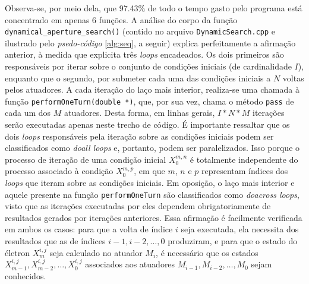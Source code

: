 \documentclass[12pt]{article}
\begin{document}
Observa-se, por meio dela, que 97.43\% de todo o tempo gasto pelo programa está
concentrado em apenas 6 funções. A análise do corpo da função
\texttt{dynamical\_aperture\_search()} (contido no arquivo
\texttt{DynamicSearch.cpp} e ilustrado pelo \textit{psedo-código}
\ref{alg:seq}, a seguir) explica perfeitamente a afirmação anterior, à medida
que explicita três \textit{loops} encadeados. Os dois primeiros são responsáveis
por iterar sobre o conjunto de condições iniciais (de cardinalidade \(I\)),
enquanto que o segundo, por submeter cada uma das condições iniciais a \(N\)
voltas pelos atuadores. A cada iteração do laço mais interior, realiza-se uma
chamada à função \texttt{performOneTurn(double *)}, que, por sua vez, chama o
método \texttt{pass} de cada um dos \(M\) atuadores.
Desta forma, em linhas gerais, \(I * N * M\) iterações serão executadas apenas
neste trecho de código. É importante ressaltar que os dois \textit{loops}
responsáveis pela iteração sobre as condições iniciais podem ser classificados
como \textit{doall loops} e, portanto, podem ser paralelizados. Isso porque o
processo de iteração de uma condição inicial \(X_0^{m,n}\) é totalmente
independente do processo associado à condição \(X_0^{m,p}\), em que \(m\), \(n\)
e \(p\) representam índices dos \textit{loops} que iteram sobre as condições
iniciais. Em oposição, o laço mais interior e aquele presente na função
\texttt{performOneTurn} são classificados como \textit{doacross loops}, visto
que as iterações executadas por eles dependem obrigatoriamente de resultados
gerados por iterações anteriores. Essa afirmação é facilmente verificada em
ambos os casos: para que a volta de índice \(i\) seja executada, ela necessita
dos resultados que as de índices \(i - 1, i - 2, \ldots, 0\) produziram, e para
que o estado do életron \(X_{m}^{i,j}\) seja calculado no atuador \(M_i\), é
necessário que os estados  \(X_{m-1}^{i,j}, X_{m-2}^{i,j}, \ldots, X_{0}^{i,j}
\) associados aos atuadores \(M_{i-1}, M_{i-2},\ldots, M_{0}\) sejam conhecidos.
\end{document}
